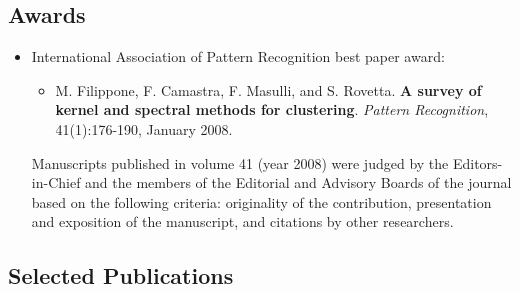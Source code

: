 \documentclass[a4paper,10pt]{article}
\begin{document}
\subsection*{Awards}
\begin{itemize}
     \item International Association of Pattern Recognition best paper award: 
       \begin{itemize}
       \item
       M. Filippone, F. Camastra, F. Masulli, and S. Rovetta.
       \textbf{A survey of kernel and spectral methods for clustering}.
       \emph{Pattern Recognition}, 41(1):176-190, January 2008.
       \end{itemize}
       Manuscripts published in volume 41 (year 2008) were judged by the Editors-in-Chief and the members of the Editorial and Advisory Boards of the journal based on the following criteria: originality of the contribution, presentation and exposition of the manuscript, and citations by other researchers.
\end{itemize}

\subsection*{Selected Publications}


\end{document}

